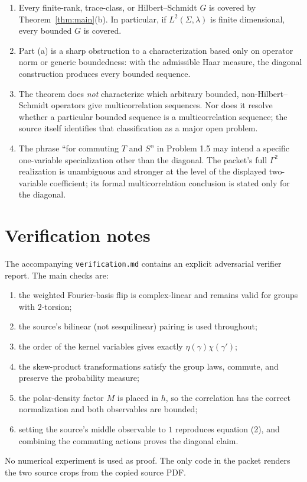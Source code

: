 \documentclass[11pt]{article}
\begin{document}
\begin{enumerate}[leftmargin=*]
\item Every finite-rank, trace-class, or Hilbert--Schmidt $G$ is covered by
Theorem~\ref{thm:main}(b).  In particular, if $L^2(\Sigma,\lambda)$ is finite
dimensional, every bounded $G$ is covered.
\item Part (a) is a sharp obstruction to a characterization based only on
operator norm or generic boundedness: with the admissible Haar measure, the
diagonal construction produces every bounded sequence.
\item The theorem does \emph{not} characterize which arbitrary bounded,
non-Hilbert--Schmidt operators give multicorrelation sequences.  Nor does it
resolve whether a particular bounded sequence is a multicorrelation sequence;
the source itself identifies that classification as a major open problem.
\item The phrase ``for commuting $T$ and $S$'' in Problem 1.5 may intend a
specific one-variable specialization other than the diagonal.  The packet's
full $\Gamma^2$ realization is unambiguous and stronger at the level of the
displayed two-variable coefficient; its formal multicorrelation conclusion is
stated only for the diagonal.
\end{enumerate}

\section{Verification notes}

The accompanying \texttt{verification.md} contains an explicit adversarial
verifier report.  The main checks are:
\begin{enumerate}[leftmargin=*]
\item the weighted Fourier-basis flip is complex-linear and remains valid for
groups with $2$-torsion;
\item the source's bilinear (not sesquilinear) pairing is used throughout;
\item the order of the kernel variables gives exactly
$\eta(\gamma)\chi(\gamma')$;
\item the skew-product transformations satisfy the group laws, commute, and
preserve the probability measure;
\item the polar-density factor $M$ is placed in $h$, so the correlation has
the correct normalization and both observables are bounded;
\item setting the source's middle observable to $1$ reproduces equation (2),
and combining the commuting actions proves the diagonal claim.
\end{enumerate}
No numerical experiment is used as proof.  The only code in the packet renders
the two source crops from the copied source PDF.
\end{document}
